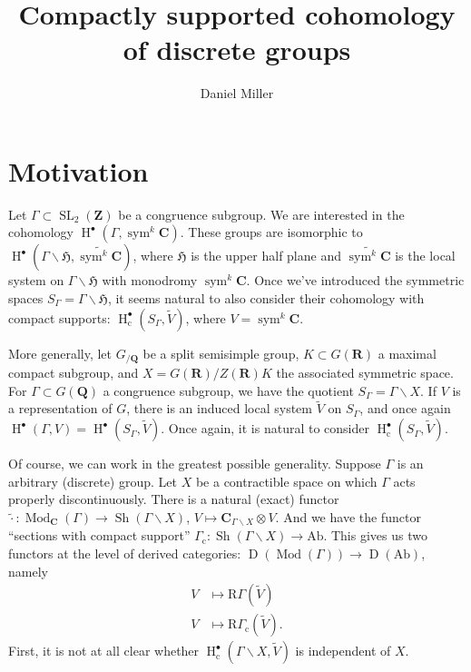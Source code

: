 \documentclass{article}
\title{Compactly supported cohomology of discrete groups}
\author{Daniel Miller}
\DeclareMathOperator{\derived}{D}
\DeclareMathOperator{\h}{H}
\DeclareMathOperator{\modules}{Mod}
\DeclareMathOperator{\sheaves}{Sh}
\DeclareMathOperator{\SL}{SL}
\DeclareMathOperator{\sym}{sym}
\newcommand{\bC}{\mathbf{C}}
\newcommand{\bQ}{\mathbf{Q}}
\newcommand{\bR}{\mathbf{R}}
\newcommand{\bZ}{\mathbf{Z}}
\newcommand{\fH}{\mathfrak{H}}
\newcommand{\abelian}{\mathrm{Ab}}
\newcommand{\compact}{\mathrm{c}}
\begin{document}
\maketitle





\section{Motivation}

Let $\Gamma\subset \SL_2(\bZ)$ be a congruence subgroup. We are interested in 
the cohomology $\h^\bullet(\Gamma,\sym^k\bC)$. These groups are isomorphic to 
$\h^\bullet(\Gamma\backslash \fH,\widetilde{\sym^k\bC})$, where $\fH$ is the 
upper half plane and $\widetilde{\sym^k\bC}$ is the local system on 
$\Gamma\backslash\fH$ with monodromy $\sym^k\bC$. Once we've introduced the 
symmetric spaces $S_\Gamma = \Gamma\backslash \fH$, it seems natural to also 
consider their cohomology with compact supports: 
$\h^\bullet_\compact(S_\Gamma,\widetilde V)$, where $V=\sym^k \bC$. 

More generally, let $G_{/\bQ}$ be a split semisimple group, $K\subset G(\bR)$ a 
maximal compact subgroup, and $X=G(\bR)/Z(\bR) K$ the associated symmetric 
space. For $\Gamma\subset G(\bQ)$ a congruence subgroup, we have the quotient 
$S_\Gamma = \Gamma\backslash X$. If $V$ is a representation of $G$, there is an 
induced local system $\widetilde V$ on $S_\Gamma$, and once again 
$\h^\bullet(\Gamma,V) = \h^\bullet(S_\Gamma,\widetilde V)$. Once again, it is 
natural to consider $\h_\compact^\bullet(S_\Gamma,\widetilde V)$. 

Of course, we can work in the greatest possible generality. Suppose $\Gamma$ is 
an arbitrary (discrete) group. Let $X$ be a contractible space on which 
$\Gamma$ acts properly discontinuously. There is a natural (exact) functor 
$\widetilde\cdot\colon \modules_\bC(\Gamma)\to \sheaves(\Gamma\backslash X)$, 
$V\mapsto \bC_{\Gamma\backslash X}\otimes V$. And we have the functor 
``sections with compact support'' 
$\Gamma_\compact\colon \sheaves(\Gamma\backslash X)\to \abelian$. This gives 
us two functors at the level of derived categories: 
$\derived(\modules(\Gamma))\to \derived(\abelian)$, namely 
\begin{align*}
	V &\mapsto \mathrm R \Gamma (\widetilde V) \\
	V &\mapsto \mathrm R \Gamma_\compact(\widetilde V) .
\end{align*}
First, it is not at all clear whether 
$\h^\bullet_\compact(\Gamma\backslash X,\widetilde V)$ is independent of $X$. 
\end{document}
